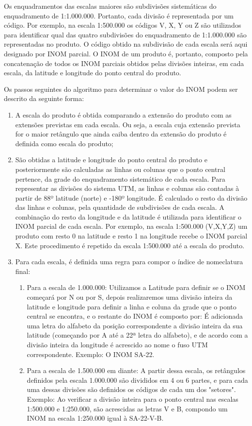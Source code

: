 Os enquadramentos das escalas maiores são subdivisões sistemáticas do enquadramento de 1:1.000.000. Portanto, cada divisão é representada por um código. Por exemplo, na escala 1:500.000 os códigos V, X, Y ou Z são utilizados para identificar qual das quatro subdivisões do enquadramento de 1:1.000.000 são representadas no produto. O código obtido na subdivisão de cada escala será aqui designado por INOM parcial. O INOM de um produto é, portanto, composto pela concatenação de todos os INOM parciais obtidos pelas divisões inteiras, em cada escala, da latitude e longitude do ponto central do produto.

Os passos seguintes do algoritmo para determinar o valor do INOM podem ser descrito da seguinte forma:

\begin{enumerate}
    \item A escala do produto é obtida comparando a extensão do produto com as extensões previstas em cada escala. Ou seja, a escala cuja extensão prevista for o maior retângulo que ainda caiba dentro da extensão do produto é definida como escala do produto;
    \item São obtidas a latitude e longitude do ponto central do produto e posteriormente são calculadas as linhas ou colunas que o ponto central pertence, da grade do enquadramento sistemático de cada escala. Para representar as divisões do sistema UTM, as linhas e colunas são contadas à partir de 88º latitude (norte) e -180º longitude. É calculado o resto da divisão das linhas e colunas, pela quantidade de subdivisões de cada escala. A combinação do resto da longitude e da latitude é utilizada para identificar o INOM parcial de cada escala. Por exemplo, na escala 1:500.000 (V,X,Y,Z) um produto com resto 0 na latitude e resto 1 na longitude recebe o INOM parcial X.  Este procedimento é repetido da escala 1:500.000 até a escala do produto.
    \item Para cada escala, é definida uma regra para compor o índice de nomeclatura final:
    \begin{enumerate}
        \item Para a escala de 1.000.000: Utilizamos a Latitude para definir se o INOM começará por N ou por S, depois realizaremos uma divisão inteira da latitude e longitude para definir a linha e coluna da grade que o ponto central se encontra, e o restante do INOM é composto por: É adicionada uma letra do alfabeto da posição correspondente a divisão inteira da sua latitude (começando por A até a 22ª letra do alfabeto), e de acordo com a divisão inteira da longitude é acrescido ao nome o fuso UTM correspondente. Exemplo: O INOM SA-22.
        \item Para a escala de 1.500.000 em diante: A partir dessa escala, os retângulos definidos pela escala 1.000.000 são divididos em 4 ou 6 partes, e para cada uma dessas divisões são definidos os códigos de cada um dos "setores". Exemplo: Ao verificar a divisão inteira para o ponto central nas escalas 1:500.000 e 1:250.000, são acrescidas as letras V e B, compondo um INOM na escala 1:250.000 igual à SA-22-V-B.
    \end{enumerate}
    
\end{enumerate}

